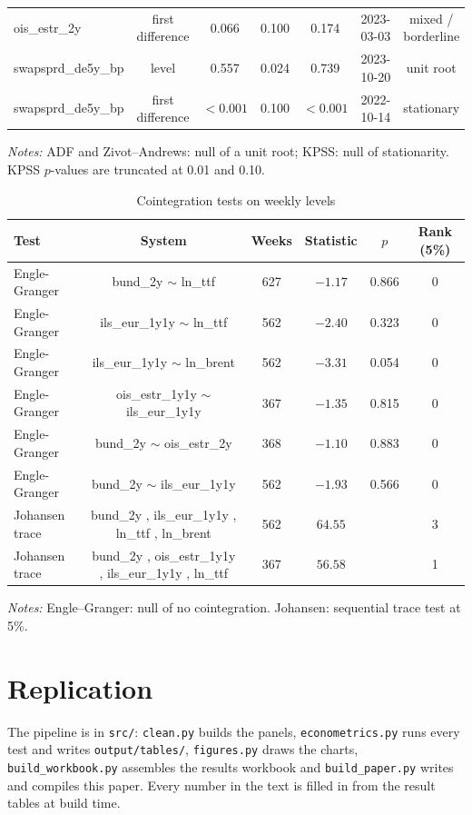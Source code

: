 \documentclass[11pt,a4paper]{article}
\begin{document}
\begin{table}[htbp]
\begin{tabular}{@{}lcccccc@{}}
ois\_estr\_2y & first difference & 0.066 & 0.100 & 0.174 & 2023-03-03 & mixed / borderline\\
swapsprd\_de5y\_bp & level & 0.557 & 0.024 & 0.739 & 2023-10-20 & unit root\\
swapsprd\_de5y\_bp & first difference & $<0.001$ & 0.100 & $<0.001$ & 2022-10-14 & stationary\\
\bottomrule
\end{tabular}
\par\vspace{4pt}\begin{minipage}{0.92\textwidth}\scriptsize\textit{Notes:} ADF and Zivot--Andrews: null of a unit root; KPSS: null of stationarity. KPSS $p$-values are truncated at 0.01 and 0.10.\end{minipage}
\end{table}
\begin{table}[htbp]\centering\scriptsize
\caption{Cointegration tests on weekly levels}\label{tab:coint}
\setlength{\tabcolsep}{5pt}
\begin{tabular}{@{}lccccc@{}}
\toprule
Test & System & Weeks & Statistic & $p$ & Rank (5\%)\\\midrule
Engle-Granger & bund\_2y $\sim$ ln\_ttf & 627 & $-1.17$ & 0.866 & 0\\
Engle-Granger & ils\_eur\_1y1y $\sim$ ln\_ttf & 562 & $-2.40$ & 0.323 & 0\\
Engle-Granger & ils\_eur\_1y1y $\sim$ ln\_brent & 562 & $-3.31$ & 0.054 & 0\\
Engle-Granger & ois\_estr\_1y1y $\sim$ ils\_eur\_1y1y & 367 & $-1.35$ & 0.815 & 0\\
Engle-Granger & bund\_2y $\sim$ ois\_estr\_2y & 368 & $-1.10$ & 0.883 & 0\\
Engle-Granger & bund\_2y $\sim$ ils\_eur\_1y1y & 562 & $-1.93$ & 0.566 & 0\\
Johansen trace & bund\_2y , ils\_eur\_1y1y , ln\_ttf , ln\_brent & 562 & $64.55$ &  & 3\\
Johansen trace & bund\_2y , ois\_estr\_1y1y , ils\_eur\_1y1y , ln\_ttf & 367 & $56.58$ &  & 1\\
\bottomrule
\end{tabular}
\par\vspace{4pt}\begin{minipage}{0.92\textwidth}\scriptsize\textit{Notes:} Engle--Granger: null of no cointegration. Johansen: sequential trace test at 5\%.\end{minipage}
\end{table}

\section{Replication}

The pipeline is in \texttt{src/}: \texttt{clean.py} builds the panels, \texttt{econometrics.py} runs every test and
writes \texttt{output/tables/}, \texttt{figures.py} draws the charts, \texttt{build\_workbook.py} assembles the results
workbook and \texttt{build\_paper.py} writes and compiles this paper. Every number in the text is filled in from the
result tables at build time.
\end{document}
